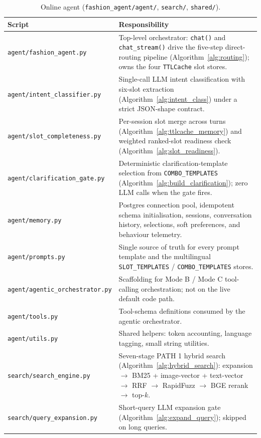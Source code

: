 \begin{table}[H]
\centering
\caption{Online agent (\texttt{fashion\_agent/agent/}, \texttt{search/}, \texttt{shared/}).}
\label{tab:impl_online_agent_scripts}
\small
\begin{tabular}{p{6.0cm} p{8.6cm}}
\toprule
\textbf{Script} & \textbf{Responsibility} \\
\midrule
\texttt{agent/fashion\_agent.py} & Top-level orchestrator: \texttt{chat()} and \texttt{chat\_stream()} drive the five-step direct-routing pipeline (Algorithm~\ref{alg:routing}); owns the four \texttt{TTLCache} slot stores. \\
\texttt{agent/intent\_classifier.py} & Single-call LLM intent classification with six-slot extraction (Algorithm~\ref{alg:intent_class}) under a strict JSON-shape contract. \\
\texttt{agent/slot\_completeness.py} & Per-session slot merge across turns (Algorithm~\ref{alg:ttlcache_memory}) and weighted ranked-slot readiness check (Algorithm~\ref{alg:slot_readiness}). \\
\texttt{agent/clarification\_gate.py} & Deterministic clarification-template selection from \texttt{COMBO\_TEMPLATES} (Algorithm~\ref{alg:build_clarification}); zero LLM calls when the gate fires. \\
\texttt{agent/memory.py} & Postgres connection pool, idempotent schema initialisation, sessions, conversation history, selections, soft preferences, and behaviour telemetry. \\
\texttt{agent/prompts.py} & Single source of truth for every prompt template and the multilingual \texttt{SLOT\_TEMPLATES} / \texttt{COMBO\_TEMPLATES} stores. \\
\texttt{agent/agentic\_orchestrator.py} & Scaffolding for Mode B / Mode C tool-calling orchestration; not on the live default code path. \\
\texttt{agent/tools.py} & Tool-schema definitions consumed by the agentic orchestrator. \\
\texttt{agent/utils.py} & Shared helpers: token accounting, language tagging, small string utilities. \\
\texttt{search/search\_engine.py} & Seven-stage PATH 1 hybrid search (Algorithm~\ref{alg:hybrid_search}): expansion $\rightarrow$ BM25 + image-vector + text-vector $\rightarrow$ RRF $\rightarrow$ RapidFuzz $\rightarrow$ BGE rerank $\rightarrow$ top-$k$. \\
\texttt{search/query\_expansion.py} & Short-query LLM expansion gate (Algorithm~\ref{alg:expand_query}); skipped on long queries. \\

\end{tabular}
\end{table}
